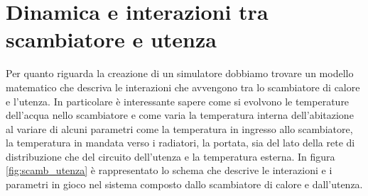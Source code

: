 \documentclass[laurea,oneside,11pt]{USiena_tesiLM}
\begin{document}
%
%
%

\section{Dinamica e interazioni tra scambiatore e utenza}
Per quanto riguarda la creazione di un simulatore dobbiamo trovare un modello matematico che descriva le interazioni che avvengono tra lo scambiatore di calore e l'utenza. In particolare è interessante sapere come si evolvono le temperature dell'acqua nello scambiatore e come varia la temperatura interna dell'abitazione al variare di alcuni parametri come la temperatura in ingresso allo scambiatore, la temperatura in mandata verso i radiatori, la portata, sia del lato della rete di distribuzione che del circuito dell'utenza e la temperatura esterna.
In figura \ref{fig:scamb_utenza} è rappresentato lo schema che descrive le interazioni e i parametri in gioco nel sistema composto dallo scambiatore di calore e dall'utenza. 
\end{document}
